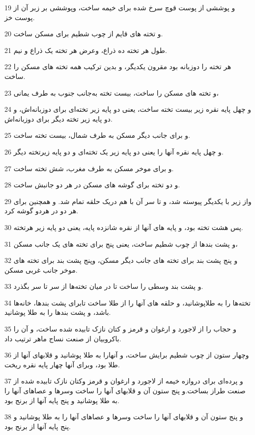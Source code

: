 \par 19 و پوششی از پوست قوچ سرخ شده برای خیمه ساخت، وپوششی بر زبر آن از پوست خز.
\par 20 و تخته های قایم از چوب شطیم برای مسکن ساخت.
\par 21 طول هر تخته ده ذراع، وعرض هر تخته یک ذراع و نیم.
\par 22 هر تخته را دوزبانه بود مقرون یکدیگر، و بدین ترکیب همه تخته های مسکن را ساخت.
\par 23 و تخته های مسکن را ساخت، بیست تخته به‌جانب جنوب به طرف یمانی،
\par 24 و چهل پایه نقره زیر بیست تخته ساخت، یعنی دو پایه زیر تخته‌ای برای دوزبانه‌اش، و دو پایه زیر تخته دیگر برای دوزبانه‌اش.
\par 25 و برای جانب دیگر مسکن به طرف شمال، بیست تخته ساخت.
\par 26 و چهل پایه نقره آنها را یعنی دو پایه زیر یک تخته‌ای و دو پایه زیرتخته دیگر.
\par 27 و برای موخر مسکن به طرف مغرب، شش تخته ساخت.
\par 28 و دو تخته برای گوشه های مسکن در هر دو جانبش ساخت.
\par 29 واز زیر با یکدیگر پیوسته شد، و تا سر آن با هم دریک حلقه تمام شد. و همچنین برای هر دو در هردو گوشه کرد.
\par 30 پس هشت تخته بود، و پایه های آنها از نقره شانزده پایه، یعنی دو پایه زیر هرتخته.
\par 31 و پشت بندها از چوب شطیم ساخت، یعنی پنج برای تخته های یک جانب مسکن،
\par 32 و پنج پشت بند برای تخته های جانب دیگر مسکن، وپنج پشت بند برای تخته های موخر جانب غربی مسکن.
\par 33 و پشت بند وسطی را ساخت تا در میان تخته‌ها از سر تا سر بگذرد.
\par 34 تخته‌ها را به طلاپوشانید، و حلقه های آنها را از طلا ساخت تابرای پشت بندها، خانه‌ها باشد، و پشت بندها را به طلا پوشانید.
\par 35 و حجاب را از لاجورد و ارغوان و قرمز و کتان نازک تابیده شده ساخت، و آن را باکروبیان از صنعت نساج ماهر ترتیب داد.
\par 36 وچهار ستون از چوب شطیم برایش ساخت، و آنهارا به طلا پوشانید و قلابهای آنها از طلا بود، وبرای آنها چهار پایه نقره ریخت.
\par 37 و پرده‌ای برای دروازه خیمه از لاجورد و ارغوان و قرمز وکتان نازک تابیده شده از صنعت طراز بساخت.و پنج ستون آن و قلابهای آنها را ساخت وسرها و عصاهای آنها را به طلا پوشانید و پنج پایه آنها از برنج بود.
\par 38 و پنج ستون آن و قلابهای آنها را ساخت وسرها و عصاهای آنها را به طلا پوشانید و پنج پایه آنها از برنج بود.
 
